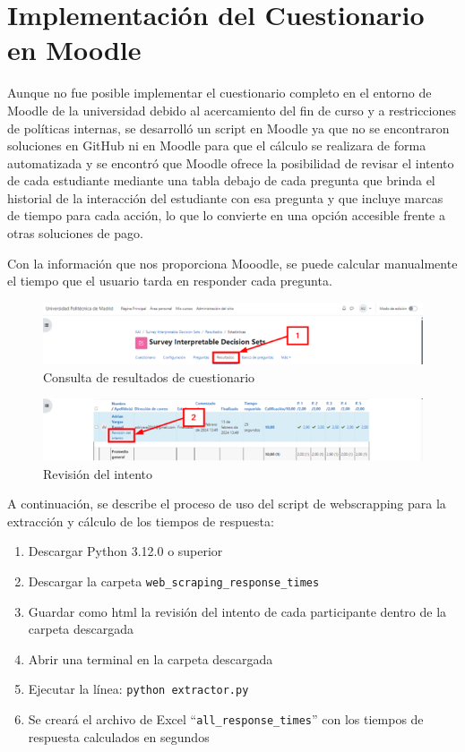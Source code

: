 \section*{Implementación del Cuestionario en Moodle}

Aunque no fue posible implementar el cuestionario completo en el entorno de Moodle de la universidad debido al acercamiento del fin de curso y a restricciones de políticas internas, se desarrolló un script en Moodle ya que no se encontraron soluciones en GitHub ni en Moodle para que el cálculo se realizara de forma automatizada y se encontró que Moodle ofrece la posibilidad de revisar el intento de cada estudiante mediante una tabla debajo de cada pregunta que brinda el historial de la interacción del estudiante con esa pregunta y que incluye marcas de tiempo para cada acción, lo que lo convierte en una opción accesible frente a otras soluciones de pago. 

Con la información que nos proporciona Mooodle, se puede calcular manualmente el tiempo que el usuario tarda en responder cada pregunta.

\begin{figure}[h]
    \centering
    \includegraphics[width=0.9\linewidth]{include/moodle_step1.png}
    \caption{Consulta de resultados de cuestionario}
    \label{fig:nasa-tlx-propio}
\end{figure}

\begin{figure}[h]
    \centering
    \includegraphics[width=0.9\linewidth]{include/moodle_step2.png}
    \caption{Revisión del intento}
    \label{fig:nasa-tlx-propio}
\end{figure}

A continuación, se describe el proceso de uso del script de webscrapping para la extracción y cálculo de los tiempos de respuesta:

\begin{enumerate}
    \item Descargar Python 3.12.0 o superior
    \item Descargar la carpeta \texttt{web\_scraping\_response\_times}
    \item Guardar como html la revisión del intento de cada participante dentro de la carpeta descargada
    \item Abrir una terminal en la carpeta descargada
    \item Ejecutar la línea: \texttt{python extractor.py}
    \item Se creará el archivo de Excel “\texttt{all\_response\_times}” con los tiempos de respuesta calculados en segundos
\end{enumerate}



